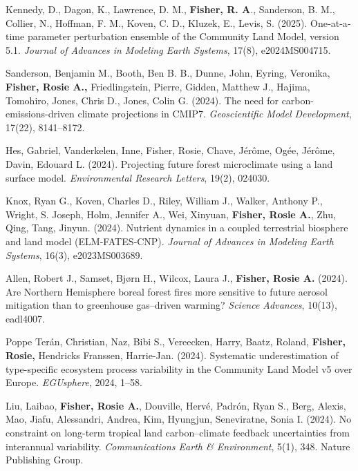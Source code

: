 \documentclass[10pt]{article}
\newenvironment{lonelist}[1][\enskip\textbullet]%
        {\vspace{-\baselineskip}\begin{list}{#1}{%
        \setlength{\itemindent}{-3pt} 
        \setlength{\partopsep}{0pt}%
        \setlength{\leftmargin}{10pt}
        \setlength{\topsep}{15pt}}}
        {\end{list}\vspace{-.3\baselineskip}}
\begin{document}
\begin{lonelist}
\item[95] Kennedy, D., Dagon, K., Lawrence, D. M., \textbf{Fisher, R. A}., Sanderson, B. M., Collier, N., Hoffman, F. M., Koven, C. D., Kluzek, E., Levis, S. (2025). One‐at‐a‐time parameter perturbation ensemble of the Community Land Model, version 5.1. \textit{Journal of Advances in Modeling Earth Systems}, 17(8), e2024MS004715.

\item[95] Sanderson, Benjamin M., Booth, Ben B. B., Dunne, John, Eyring, Veronika, \textbf{Fisher, Rosie A., }Friedlingstein, Pierre, Gidden, Matthew J., Hajima, Tomohiro, Jones, Chris D., Jones, Colin G. (2024). The need for carbon-emissions-driven climate projections in CMIP7. \textit{Geoscientific Model Development}, 17(22), 8141–8172.

\item[95] Hes, Gabriel, Vanderkelen, Inne, Fisher, Rosie, Chave, Jérôme, Ogée, Jérôme, Davin, Edouard L. (2024). Projecting future forest microclimate using a land surface model. \textit{Environmental Research Letters}, 19(2), 024030. 

\item[95] Knox, Ryan G., Koven, Charles D., Riley, William J., Walker, Anthony P., Wright, S. Joseph, Holm, Jennifer A., Wei, Xinyuan, \textbf{Fisher, Rosie A.}, Zhu, Qing, Tang, Jinyun. (2024). Nutrient dynamics in a coupled terrestrial biosphere and land model (ELM‐FATES‐CNP). \textit{Journal of Advances in Modeling Earth Systems}, 16(3), e2023MS003689.

\item[95] Allen, Robert J., Samset, Bjørn H., Wilcox, Laura J., \textbf{Fisher, Rosie A.} (2024). Are Northern Hemisphere boreal forest fires more sensitive to future aerosol mitigation than to greenhouse gas–driven warming? \textit{Science Advances}, 10(13), eadl4007. 

\item[89] Poppe Terán, Christian, Naz, Bibi S., Vereecken, Harry, Baatz, Roland, \textbf{Fisher, Rosie,} Hendricks Franssen, Harrie-Jan. (2024). Systematic underestimation of type-specific ecosystem process variability in the Community Land Model v5 over Europe. \textit{EGUsphere}, 2024, 1–58. 

\item[88] Liu, Laibao, \textbf{Fisher, Rosie A.}, Douville, Hervé, Padrón, Ryan S., Berg, Alexis, Mao, Jiafu, Alessandri, Andrea, Kim, Hyungjun, Seneviratne, Sonia I. (2024). No constraint on long-term tropical land carbon–climate feedback uncertainties from interannual variability. \textit{Communications Earth \& Environment}, 5(1), 348. Nature Publishing Group.


\end{lonelist}
\end{document}
